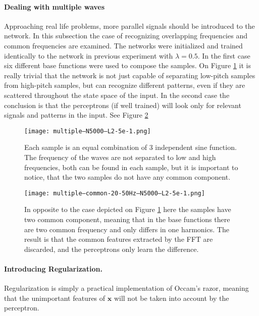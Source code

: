 \paragraph{Dealing with multiple waves}
Approaching real life problems, more parallel signals should be introduced to the network. In this subsection the case of recognizing overlapping frequencies and common frequencies are examined. The networks were initialized and trained identically to the network in previous experiment with $\lambda=0.5$. In the first case six different base functions were used to compose the samples. On Figure \ref{fig:multi} it is really trivial that the network is not just capable of separating low-pitch samples from high-pitch samples, but can recognize different patterns, even if they are scattered throughout the state space of the input. In the second case the conclusion is that the perceptrons (if well trained) will look only for relevant signals and patterns in the input.  See Figure \ref{fig:multi-common}

\begin{figure}
	\centering
	\texttt{[image: multiple---N5000---L2-5e-1.png]}
	\caption{Each sample is an equal combination of 3 independent sine function. The frequency of the waves are not separated to low and high frequencies, both can be found in each sample, but it is important to notice, that the two samples do not have any common component.}
	
	\label{fig:multi}
\end{figure}


\begin{figure}
	\centering
	\texttt{[image: multiple--common-20-50Hz--N5000---L2-5e-1.png]}
	\caption{In opposite to the case depicted on Figure \ref{fig:multi} here the samples have two common component, meaning that in the base functions there are two common frequency and only differs in one harmonics. The result is that the common features extracted by the FFT are discarded, and the perceptrons only learn the difference.}
	
	\label{fig:multi-common}
\end{figure}

\paragraph{Introducing Regularization.}
Regularization is simply a practical implementation of Occam's razor, meaning that the unimportant features of $\mathbf{x}$ will not be taken into account by the perceptron. 

